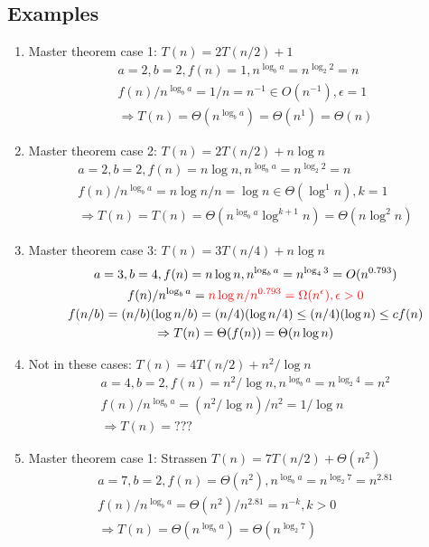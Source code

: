\documentclass[a4paper]{article}
\theoremstyle{plain}
\begin{document}
\subsection*{Examples}
\begin{enumerate}
    \item Master theorem case 1: $T(n) = 2T(n/2) + 1$
    \begin{align*}
        a=2, b=2, f(n)=1,n^{\log_b{a}}=n^{\log_2{2}}=n\\
 f(n)/{n^{\log_b{a}}}=1/n=n^{-1}\in O(n^{-1}), \epsilon=1\\
 \Rightarrow T(n)=\Theta(n^{\log_b{a}})=\Theta(n^1)=\Theta(n)
    \end{align*}
    \item Master theorem case 2: $T(n) = 2T(n/2) + n\log{n}$
    \begin{align*}
        a=2, b=2, f(n)=n\log{n},n^{\log_b{a}}=n^{\log_2{2}}=n\\
 f(n)/{n^{\log_b{a}}}={n\log{n}}/n=\log{n}\in \Theta({\log^1{n}}), k=1\\
 \Rightarrow T(n)=T(n)=\Theta(n^{\log_b{a}} {\log^{k+1}{n}})=\Theta(n {\log^{2}{n}})
    \end{align*}
    \item Master theorem case 3: $T(n) = 3T(n/4) + n\log{n}$
    \begin{gather*}
        a=3, b=4, f(n)=n\log{n},n^{\log_b{a}}=n^{\log_4{3}}=O(n^{0.793})\\
        f(n)/{n^{\log_b{a}}}=\textcolor{red}{ {n\log{n}}/{n^{0.793}}=\Omega(n^{\epsilon}),\epsilon>0}\\
        f(n/b)=(n/b)(\log{n/b})=(n/4)(\log{n/4})\leq (n/4)(\log{n})\leq cf(n)\\
        \Rightarrow T(n)=\Theta(f(n))=\Theta(n\log{n})
    \end{gather*}
    \item Not in these cases: $T(n) = 4T(n/2) + n^2/{\log n}$
    \begin{gather*}
        a=4, b=2, f(n)=n^2/{\log n},n^{\log_b{a}}=n^{\log_2{4}}=n^2\\
 f(n)/{n^{\log_b{a}}}=(n^2/{\log n})/{n^2}=1/\log{n}\\
 \Rightarrow T(n)=???
    \end{gather*}
    \item Master theorem case 1: Strassen $T(n) = 7T(n/2) + \Theta(n^2)$
    \begin{gather*}
        a=7, b=2, f(n)=\Theta(n^2),n^{\log_b{a}}=n^{\log_2{7}}=n^{2.81}\\
        f(n)/{n^{\log_b{a}}}={\Theta(n^2)}/{n^{2.81}}=n^{-k}, k>0\\
        \Rightarrow T(n)=\Theta(n^{\log_b{a}})=\Theta(n^{\log_2{7}})
    \end{gather*}
\end{enumerate}
\end{document}
